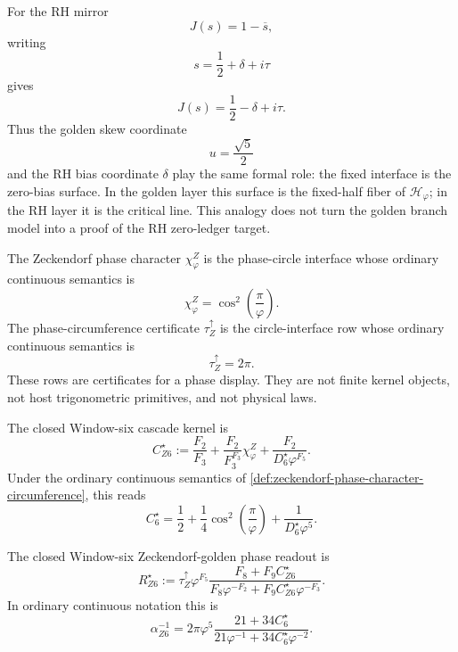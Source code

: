 \begin{principle}
\label{prin:zeckendorf-critical-line-analogue}
For the RH mirror
$$
J(s)=1-\overline{s},
$$
writing
$$
s=\frac12+\delta+i\tau
$$
gives
$$
J(s)=\frac12-\delta+i\tau.
$$
Thus the golden skew coordinate
$$
u=\frac{\sqrt5}{2}
$$
and the RH bias coordinate $\delta$ play the same formal role: the
fixed interface is the zero-bias surface. In the golden layer this
surface is the fixed-half fiber of $\mathcal H_{\varphi}$; in the RH
layer it is the critical line. This analogy does not turn the golden
branch model into a proof of the RH zero-ledger target.
\end{principle}

\begin{definition}
\label{def:zeckendorf-phase-character-circumference}
The Zeckendorf phase character \(\chi_\varphi^Z\) is the phase-circle
interface whose ordinary continuous semantics is
$$
  \chi_\varphi^Z
  =
  \cos^2\left(\frac{\pi}{\varphi}\right).
$$
The phase-circumference certificate \(\tau_Z^\uparrow\) is the
circle-interface row whose ordinary continuous semantics is
$$
  \tau_Z^\uparrow=2\pi.
$$
These rows are certificates for a phase display. They are not finite
kernel objects, not host trigonometric primitives, and not physical
laws.
\end{definition}

\begin{definition}
\label{def:zeckendorf-window-six-closed-cascade-kernel}
The closed Window-six cascade kernel is
$$
  C_{Z6}^\star
  :=
  \frac{F_2}{F_3}
  +
  \frac{F_2}{F_3^{F_3}}\chi_\varphi^Z
  +
  \frac{F_2}{D_6^\star\varphi^{F_5}}.
$$
Under the ordinary continuous semantics of
\autoref{def:zeckendorf-phase-character-circumference}, this reads
$$
  C_6^\star
  =
  \frac12
  +
  \frac14\cos^2\left(\frac{\pi}{\varphi}\right)
  +
  \frac{1}{D_6^\star\varphi^5}.
$$
\end{definition}

\begin{definition}
\label{def:zeckendorf-window-six-closed-phase-readout}
The closed Window-six Zeckendorf-golden phase readout is
$$
  R_{Z6}^\star
  :=
  \tau_Z^\uparrow\varphi^{F_5}
  \frac{
    F_8+F_9C_{Z6}^\star
  }{
    F_8\varphi^{-F_2}
    +
    F_9C_{Z6}^\star\varphi^{-F_3}
  }.
$$
In ordinary continuous notation this is
$$
  \alpha_{Z6}^{-1}
  =
  2\pi\varphi^5
  \frac{
    21+34C_6^\star
  }{
    21\varphi^{-1}+34C_6^\star\varphi^{-2}
  }.
$$
\end{definition}

